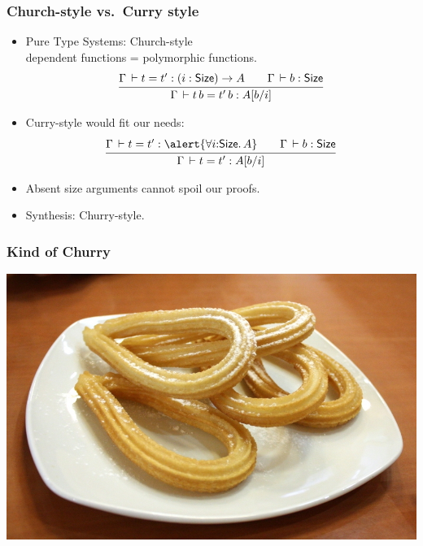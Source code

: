 \documentclass[t,fleqn]{beamer}
\makeatletter
\renewcommand{\ru}[2]{\dfrac{\begin{array}[b]{@{}c@{}} #1 \end{array}}{\begin{array}[t]{@{}l@{}} #2 \end{array}}}
\newcommand{\cAnn}{\color{red!80!black}}%
\renewcommand{\emph}[1]{{\cAnn#1}}
\makeatother
\begin{document}
\begin{frame}%
  \frametitle{Church-style vs.\ Curry style}
  \begin{itemize}
  \item Pure Type Systems: Church-style \\
    dependent functions = polymorphic functions.
\[
  \ru{\Gamma \der t = t' : (i : \Size) \to A \qquad
      \Gamma \der b : \Size
    }{\Gamma \der t\,b = t'\,b : A[b/i]
    }
\]
\vspace{-2ex}
  \item Curry-style would fit our needs:
\[
  \ru{\Gamma \der t = t' : \alert{\forall i{:}\Size.\, A} \qquad
      \Gamma \der b : \Size
    }{\Gamma \der t = t' : A[b/i]}
\]
\vspace{-2ex}
  \item Absent size arguments cannot spoil our proofs.
  \item<2> Synthesis: \emph{Churry-style}.
  \end{itemize}
\end{frame}

\begin{frame}%
  \frametitle{Kind of Churry}
   \includegraphics[width=\textwidth]{Churros_Madrid.jpg}
\end{frame}
\end{document}
